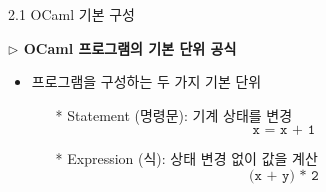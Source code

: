 \documentclass[10pt]{beamer}
\begin{document}
	\begin{frame}{2.1 OCaml 기본 구성}
		
		\textbf{$\triangleright$ OCaml 프로그램의 기본 단위 공식}
	\begin{itemize}
		\item 프로그램을 구성하는 두 가지 기본 단위
		\begin{itemize}
			\item[]
			\item[*] Statement (명령문): 기계 상태를 변경 \[
			\texttt{x = x + 1}
			\]
			\item[*] Expression (식): 상태 변경 없이 값을 계산 \[
			\texttt{(x + y) * 2}
			\]
		\end{itemize}
		\item[]
		\item[]
		\item[]
		\begin{itemize}
			\item[]
			\item[]
			\begin{itemize}
				\item[] 
				\item[]
			\end{itemize}
			\item[]
			\item[]
			\begin{itemize}
				\item[]
				\item[]
			\end{itemize}
		\end{itemize}
	\end{itemize}
\end{frame}
\end{document}
